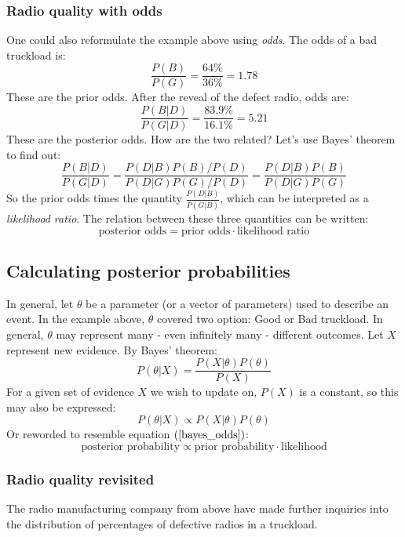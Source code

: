 \documentclass[12pt, a4paper]{article}
\begin{document}
\subsubsection{Radio quality with odds}
One could also reformulate the example above using \textit{odds}. The odds of a bad truckload is:
\begin{equation}
\frac{P(B)}{P(G)}=\frac{64\%}{36\%}=1.78
\end{equation} 
These are the prior odds. After the reveal of the defect radio, odds are:
\begin{equation}
\frac{P(B|D)}{P(G|D)}=\frac{83.9\%}{16.1\%}=5.21
\end{equation}
These are the posterior odds. How are the two related? Let's use Bayes' theorem to find out:
\begin{equation}
\frac{P(B|D)}{P(G|D)}=\frac{P(D|B)P(B)/P(D)}{P(D|G)P(G)/P(D)}=\frac{P(D|B)P(B)}{P(D|G)P(G)}
\end{equation}
So the prior odds times the quantity $\frac{P(D|B)}{P(G|B)}$, which can be interpreted as a \textit{likelihood ratio}. The relation between these three quantities can be written:
\begin{equation}
\label{bayes_odds}
\textrm{posterior odds}=\textrm{prior odds}\cdot\textrm{likelihood ratio}
\end{equation}

\subsection{Calculating posterior probabilities}
In general, let $\theta$ be a parameter (or a vector of parameters) used to describe an event. In the example above, $\theta$ covered two option: Good or Bad truckload. In general, $\theta$ may represent many - even infinitely many - different outcomes. Let $X$ represent new evidence. By Bayes' theorem:
\begin{equation}
P(\theta|X)=\frac{P(X|\theta)P(\theta)}{P(X)}
\end{equation}
For a given set of evidence $X$ we wish to update on, $P(X)$ is a constant, so this may also be expressed:
\begin{equation}
P(\theta|X)\propto P(X|\theta)P(\theta)
\end{equation}
Or reworded to resemble equation $(\ref{bayes_odds})$:
\begin{equation}
\label{bayes_prob}
\textrm{posterior probability}\propto\textrm{prior probability}\cdot\textrm{likelihood}
\end{equation}

\subsubsection{Radio quality revisited}
The radio manufacturing company from above have made further inquiries into the distribution of percentages of defective radios in a truckload.
\end{document}
